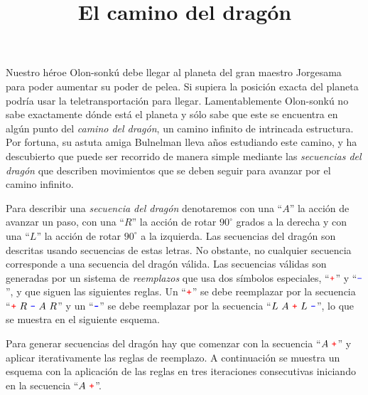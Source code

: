 \documentclass{oci}
\title{El camino del drag\'on}
\renewcommand{\u}{{\color{red}\texttt{+}}}
\renewcommand{\d}{{\color{blue}\texttt{-}}}
\begin{document}
\maketitle
Nuestro héroe Olon-sonkú debe llegar al planeta del gran maestro Jorgesama para poder aumentar su poder de pelea.
Si supiera la posición exacta del planeta podría usar la teletransportación para llegar. Lamentablemente Olon-sonkú no sabe exactamente dónde está el planeta y sólo sabe que este se encuentra en algún punto del \emph{camino del dragón}, un camino infinito de intrincada estructura. 
Por fortuna, %
su astuta amiga Bulnelman lleva años estudiando este camino, y ha descubierto que puede ser recorrido de manera simple mediante las \emph{secuencias del dragón} que describen movimientos que se deben seguir para avanzar por el camino infinito.

Para describir una \emph{secuencia del dragón} denotaremos con una ``$A$'' la acción de avanzar un paso, con una ``$R$'' la acción de rotar $90^{\circ}$ grados a la derecha y con una ``$L$'' la acción de rotar $90^{\circ}$ a la izquierda.
Las secuencias del dragón son descritas usando secuencias de estas letras. No obstante, no cualquier secuencia corresponde a una secuencia del dragón válida.
Las secuencias válidas son generadas por un sistema de \emph{reemplazos} que usa dos símbolos especiales, ``$\u$'' y ``$\d$'', y que siguen las siguientes reglas.
Un ``$\u$'' se debe reemplazar por la secuencia ``$\u\ R\ \d\ A\ R$'' y un ``$\d$'' se debe reemplazar por la secuencia ``$L\ A\ \u\ L\ \d$'', lo que se muestra en el siguiente esquema.
\vspace{-0.3em}
\begin{center}
\scalebox{0.8}
{}
\end{center}
\vspace{-0.4em}

Para generar secuencias del dragón hay que comenzar con la secuencia ``$A\ \u$'' y aplicar iterativamente las reglas de reemplazo.
A continuación se muestra un esquema con la aplicación de las reglas en tres iteraciones consecutivas iniciando en la secuencia ``$A\ \u$''.
\begin{center}
\scalebox{0.8}
{ 
}
\end{center}
\end{document}
